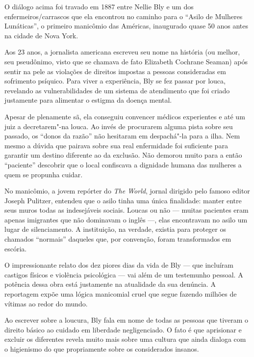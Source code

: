 \begin{multicols}{2}
{\small{}}

\vspace{\baselineskip}

O diálogo acima foi travado em 1887 entre Nellie
Bly e um dos enfermeiros/carrascos que ela
encontrou no caminho para o “Asilo de Mulheres
Lunáticas”, o primeiro manicômio das Américas,
inaugurado quase 50 anos antes na cidade de
Nova York.

Aos 23 anos, a jornalista americana escreveu
seu nome na história (ou melhor, seu pseudônimo,
visto que se chamava de fato Elizabeth
Cochrane Seaman) após sentir na pele as violações
de direitos impostas a pessoas consideradas
em sofrimento psíquico. Para viver a experiência,
Bly se fez passar por louca, revelando as vulnerabilidades
de um sistema de atendimento que foi criado
justamente para alimentar o estigma da doença mental.

Apesar de plenamente sã, ela conseguiu
convencer médicos experientes e até um juiz a
decretarem"-na louca. Ao invés de procurarem
alguma pista sobre seu passado, os “donos da
razão” não hesitaram em despachá"-la para a ilha.
Nem mesmo a dúvida que pairava sobre sua
real enfermidade foi suficiente para garantir um
destino diferente ao da exclusão. Não demorou
muito para a então “paciente” descobrir que o
local confiscava a dignidade humana das mulheres
a quem se propunha cuidar.

No manicômio, a jovem repórter do \textit{The World},
jornal dirigido pelo famoso editor Joseph Pulitzer,
entendeu que o asilo tinha uma única finalidade:
manter entre seus muros todas as indesejáveis
sociais. Loucas ou não — muitas pacientes eram
apenas imigrantes que não dominavam o inglês
—, elas encontravam no asilo um lugar de silenciamento.
A instituição, na verdade, existia para
proteger os chamados “normais” daqueles que,
por convenção, foram transformados em escória.

O impressionante relato dos dez piores dias
da vida de Bly — que incluíram castigos físicos
e violência psicológica — vai além de um testemunho
pessoal. A potência dessa obra está
justamente na atualidade da sua denúncia.
A reportagem expõe uma lógica manicomial cruel que
segue fazendo milhões de vítimas ao redor do
mundo.

Ao escrever sobre a loucura, Bly fala em nome
de todas as pessoas que tiveram o direito básico
ao cuidado em liberdade negligenciado. O fato é
que aprisionar e excluir os diferentes revela muito
mais sobre uma cultura que ainda dialoga com o
higienismo do que propriamente sobre os considerados insanos.


\end{multicols}
